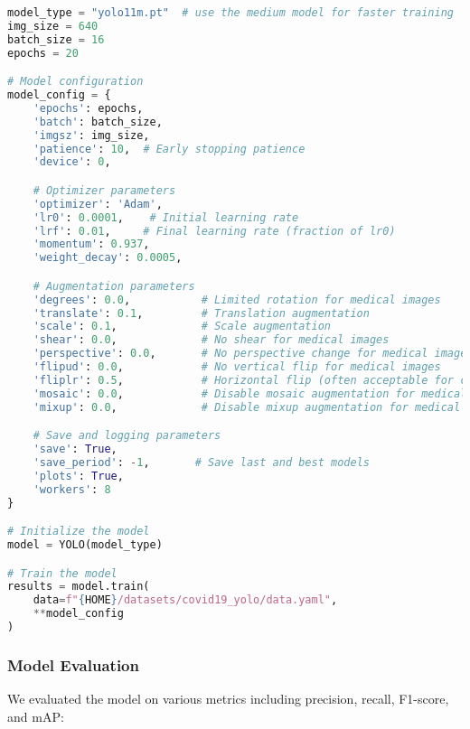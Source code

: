\begin{lstlisting}[language=Python, caption={COVID-19 X-ray Model Configuration and Training}, label={lst:covid-train}]
model_type = "yolo11m.pt"  # use the medium model for faster training
img_size = 640
batch_size = 16
epochs = 20

# Model configuration
model_config = {
    'epochs': epochs,
    'batch': batch_size,
    'imgsz': img_size,
    'patience': 10,  # Early stopping patience
    'device': 0,

    # Optimizer parameters
    'optimizer': 'Adam',
    'lr0': 0.0001,    # Initial learning rate
    'lrf': 0.01,     # Final learning rate (fraction of lr0)
    'momentum': 0.937,
    'weight_decay': 0.0005,

    # Augmentation parameters
    'degrees': 0.0,           # Limited rotation for medical images
    'translate': 0.1,         # Translation augmentation
    'scale': 0.1,             # Scale augmentation
    'shear': 0.0,             # No shear for medical images
    'perspective': 0.0,       # No perspective change for medical images
    'flipud': 0.0,            # No vertical flip for medical images
    'fliplr': 0.5,            # Horizontal flip (often acceptable for chest X-rays)
    'mosaic': 0.0,            # Disable mosaic augmentation for medical images
    'mixup': 0.0,             # Disable mixup augmentation for medical images

    # Save and logging parameters
    'save': True,
    'save_period': -1,       # Save last and best models
    'plots': True,
    'workers': 8
}

# Initialize the model
model = YOLO(model_type)

# Train the model
results = model.train(
    data=f"{HOME}/datasets/covid19_yolo/data.yaml",
    **model_config
)
\end{lstlisting}

\subsubsection{Model Evaluation}
We evaluated the model on various metrics including precision, recall, F1-score, and mAP:

